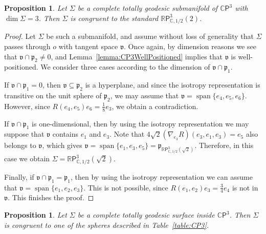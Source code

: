 \documentclass[11pt,a4paper,final]{amsart}
\newcommand{\s}{\mathsf}
\newcommand{\g}{\mathfrak}
\newcommand{\R}{\mathbb{R}}
\newcommand{\C}{\mathbb{C}}
\newcommand{\vecspan}{\operatorname{span}}
\newtheorem{proposition}[theorem]{Proposition}
\theoremstyle{definition}
\begin{document}
\begin{proposition}
	\label{prop:3tgcp3}
	Let $\Sigma$ be a complete totally geodesic submanifold of $\C\s{P}^{3}$ with $\dim \Sigma = 3$.
	Then $\Sigma$ is congruent to the standard $\R\mathsf{P}^{3}_{\C,1/2}(2)$.
\end{proposition}
\begin{proof}
	Let $\Sigma$ be such a submanifold, and assume without loss of generality that $\Sigma$ passes through $o$ with tangent space $\g{v}$.
	Once again, by dimension reasons we see that $\g{v}\cap \g{p}_{2}\neq 0$, and Lemma~\ref{lemma:CP3WellPositioned} implies that $\g{v}$ is well-positioned.
	We consider three cases according to the dimension of $\g{v}\cap\g{p}_{1}$.
		
	If $\g{v}\cap \g{p}_{1}=0$, then $\g{v}\subseteq \g{p}_{2}$ is a hyperplane, and since the isotropy representation is transitive on the unit sphere of $\g{p}_{2}$, we may assume that $\g{v}=\vecspan\{e_{4},e_{5},e_{6}\}$.
	However, since $R(e_{4},e_{5})e_{6}=\frac{1}{8}e_{3}$, we obtain a contradiction.
		
	If $\g{v}\cap \g{p}_{1}$ is one-dimensional, then by using the isotropy representation we may suppose that $\g{v}$ contains $e_{1}$ and $e_{3}$.
	Note that $4\sqrt{2}(\nabla_{e_{3}}R)(e_{3},e_{1},e_{3})=e_{5}$ also belongs to $\g{v}$, which gives $\g{v}=\vecspan\{e_{1},e_{3},e_{5}\}=\g{p}_{\R\mathsf{P}^{3}_{\C,1/2}(\sqrt{2})}$.
	Therefore, in this case we obtain $\Sigma=\R\mathsf{P}^{3}_{\C,1/2}(\sqrt{2})$.
	
	Finally, if $\g{v}\cap \g{p}_{1}=\g{p}_{1}$, then by using the isotropy representation we can assume that $\g{v}=\vecspan\{e_{1},e_{2},e_{3}\}$.
	This is not possible, since $R(e_{1},e_{2})e_{3}=\frac{3}{4}e_{4}$ is not in $\g{v}$.
	This finishes the proof.
\end{proof}
\begin{proposition}
	\label{prop:2tgcp3}
	Let $\Sigma$ be a complete totally geodesic surface inside $\C\mathsf{P}^{3}$.
	Then $\Sigma$ is congruent to one of the spheres described in Table~\ref{table:CP3}.
\end{proposition}
\end{document}
